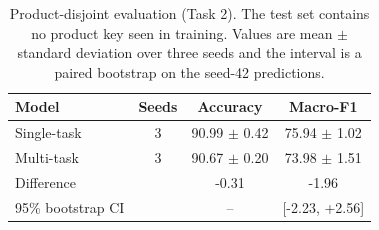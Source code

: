 \begin{table}[t]
\caption{Product-disjoint evaluation (Task 2). The test set contains no product key seen in training. Values are mean $\pm$ standard deviation over three seeds and the interval is a paired bootstrap on the seed-42 predictions.}
\label{tab:disjoint}
\centering
\small
\begin{tabular}{@{}lccc@{}}
\toprule
Model & Seeds & Accuracy & Macro-F1 \\
\midrule
Single-task \phobert{} & 3 & 90.99 $\pm$ 0.42 & 75.94 $\pm$ 1.02 \\
Multi-task \phobert{} & 3 & 90.67 $\pm$ 0.20 & 73.98 $\pm$ 1.51 \\
Difference & & -0.31 & -1.96 \\
95\% bootstrap CI & & -- & [-2.23, +2.56] \\

\bottomrule
\end{tabular}
\end{table}
